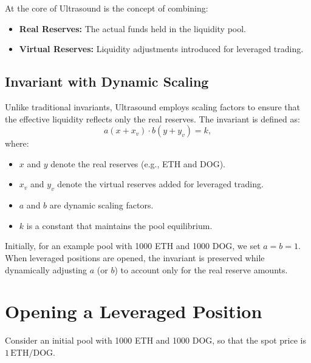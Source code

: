 \documentclass[11pt]{article}
\begin{document}
At the core of Ultrasound is the concept of combining:
\begin{itemize}
    \item \textbf{Real Reserves:} The actual funds held in the liquidity pool.
    \item \textbf{Virtual Reserves:} Liquidity adjustments introduced for leveraged trading.
\end{itemize}

\subsection{Invariant with Dynamic Scaling}
Unlike traditional invariants, Ultrasound employs scaling factors to ensure that the effective liquidity reflects only the real reserves. The invariant is defined as:
\[
a(x + x_v)\cdot b(y + y_v) = k,
\]
where:
\begin{itemize}
    \item \(x\) and \(y\) denote the real reserves (e.g., ETH and DOG).
    \item \(x_v\) and \(y_v\) denote the virtual reserves added for leveraged trading.
    \item \(a\) and \(b\) are dynamic scaling factors.
    \item \(k\) is a constant that maintains the pool equilibrium.
\end{itemize}

Initially, for an example pool with 1000 ETH and 1000 DOG, we set \(a=b=1\). When leveraged positions are opened, the invariant is preserved while dynamically adjusting \(a\) (or \(b\)) to account only for the real reserve amounts.

\section{Opening a Leveraged Position}

Consider an initial pool with 1000 ETH and 1000 DOG, so that the spot price is \(1\,\text{ETH/DOG}\).
\end{document}
